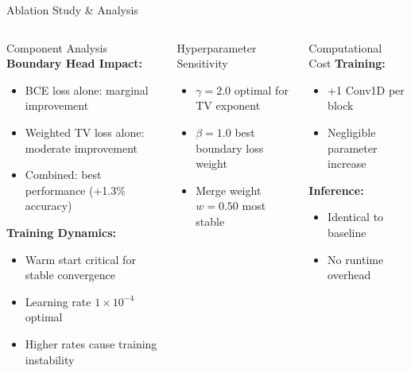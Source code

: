 \documentclass[9pt,aspectratio=169]{beamer}
\begin{document}
\begin{frame}[label=slide9]{Ablation Study \& Analysis}
  \begin{columns}[T,onlytextwidth]
      \begin{block}{Component Analysis}
        \textbf{Boundary Head Impact:}
        \begin{itemize}
          \item BCE loss alone: marginal improvement
          \item Weighted TV loss alone: moderate improvement
          \item Combined: best performance (+1.3\% accuracy)
        \end{itemize}
        
        \textbf{Training Dynamics:}
        \begin{itemize}
          \item Warm start critical for stable convergence
          \item Learning rate $1 \times 10^{-4}$ optimal
          \item Higher rates cause training instability
        \end{itemize}
      \end{block}
      
      \begin{block}{Hyperparameter Sensitivity}
        \begin{itemize}
          \item $\gamma = 2.0$ optimal for TV exponent
          \item $\beta = 1.0$ best boundary loss weight
          \item Merge weight $w = 0.50$ most stable
        \end{itemize}
      \end{block}
      
      \begin{block}{Computational Cost}
        \textbf{Training:}
        \begin{itemize}
          \item +1 Conv1D per block
          \item Negligible parameter increase
        \end{itemize}
        
        \textbf{Inference:}
        \begin{itemize}
          \item Identical to baseline
          \item No runtime overhead
        \end{itemize}
      \end{block}
      

\end{columns}
\end{frame}
\end{document}

